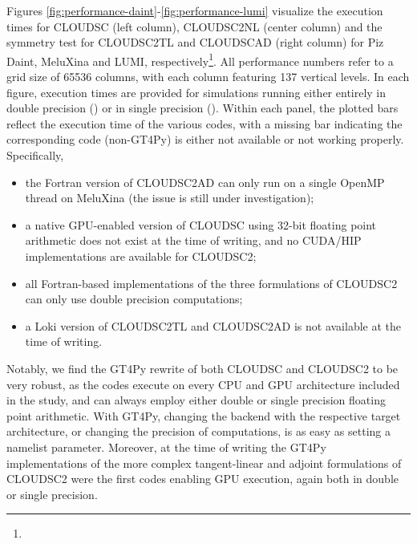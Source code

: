 \documentclass[main.tex]{subfiles}
\begin{document}
        Figures \ref{fig:performance-daint}-\ref{fig:performance-lumi} visualize the execution times for CLOUDSC (left column), CLOUDSC2NL  (center column) and the symmetry test for CLOUDSC2TL and CLOUDSCAD (right column) for Piz Daint, MeluXina and LUMI, respectively\footnote{}. All performance numbers refer to a grid size of 65536 columns, with each column featuring 137 vertical levels. In each figure, execution times are provided for simulations running either entirely in double precision () or in single precision (). Within each panel, the plotted bars reflect the execution time of the various codes, with a missing bar indicating the corresponding code (non-GT4Py) is either not available or not working properly. Specifically,
        \begin{itemize}
            \item the Fortran version of CLOUDSC2AD can only run on a single OpenMP thread on MeluXina (the issue is still under investigation);
            \item a native GPU-enabled version of CLOUDSC using 32-bit floating point arithmetic does not exist at the time of writing, and no CUDA/HIP implementations are available for CLOUDSC2;
            \item all Fortran-based implementations of the three formulations of CLOUDSC2 can only use double precision computations;
            \item a Loki version of CLOUDSC2TL and CLOUDSC2AD is not available at the time of writing.
        \end{itemize}

        \noindent Notably, we find the GT4Py rewrite of both CLOUDSC and CLOUDSC2 to be very robust, as the codes execute on every CPU and GPU architecture included in the study, and can always employ either double or single precision floating point arithmetic. With GT4Py, changing the backend with the respective target architecture, or changing the precision of computations, is as easy as setting a namelist parameter. Moreover, at the time of writing the GT4Py implementations of the more complex tangent-linear and adjoint formulations of CLOUDSC2 were the first codes enabling GPU execution, again both in double or single precision.
\end{document}
